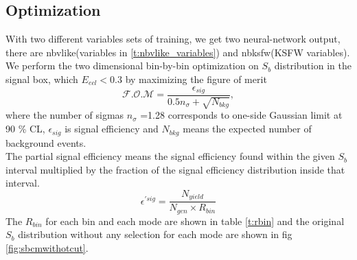 \subsection{Optimization}
With two different variables sets of training, we get two neural-network output, there are nbvlike(variables in \ref{t:nbvlike_variables}) and nbksfw(KSFW variables). We perform the two dimensional bin-by-bin optimization on $S_b$ distribution in the signal box, which $E_{ecl} < 0.3$ by maximizing the figure of merit\cite{ref:Punzi2003}
\begin{equation}
\label{eq:fom}
\mathcal{F.O.M} = \frac{\epsilon_{sig}}{0.5 n_{\sigma}+\sqrt{N_{bkg}}},
\end{equation}
where the number of sigmas $n_\sigma$ =1.28 corresponds to one-side Gaussian limit at 90 \% CL, $\epsilon_{sig}$ is signal efficiency and $N_{bkg}$ means the expected number of background events.\\
The partial signal efficiency means the signal efficiency found within the given $S_b$ interval multiplied by the fraction of the signal efficiency distribution inside that interval.
\begin{equation}
\label{eq:peff}
\epsilon^{'sig} = \frac{N_{yield}}{N_{gen} \times R_{bin} } 
\end{equation}
The $R_{bin}$ for each bin and each mode are shown in table \ref{t:rbin} and the original $S_b$ distribution without any selection for each mode are shown in fig \ref{fig:sbcmwithotcut}. 
